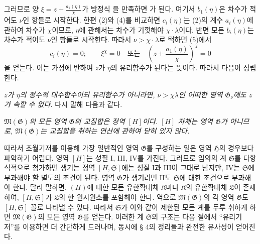 그러므로 양 $\xi=z+\frac{a_1(\eta)}{\chi}$가 방정식
을 만족하면
가 된다. 여기서 $b_1(\eta)$은 차수가 적어도 $\nu$인 항들로 시작한다. 한편 (2)와 (4)를 비교하면 $c_i(\eta)$는 (2)의 계수 $a_i(\eta)$에 관하여 차수가 $\chi$이므로, $\eta$에 관해서는 차수가 기껏해야 $\chi\cdot\lambda$이다. 반면 모든 $b_i(\eta)$는 차수가 적어도 $\nu$인 항들로 시작한다. 따라서 $\nu>\chi\cdot\lambda$로 택하면 (5)에서
\[
 c_i(\eta)=0;\qquad
 \xi^\chi=0\quad\text{또는}\quad
 \left(z+\frac{a_1(\eta)}{\chi}\right)^\chi=0
\]
을 얻는다. 이는 가정에 반하여 $z$가 $\eta$의 유리함수가 된다는 뜻이다. 따라서 다음이 성립한다.

\emph{$z$가 $\eta$의 정수적 대수함수이되 유리함수가 아니라면, $\nu>\chi\lambda$인 어떠한 영역 $\mathfrak G_\nu$에도 $z$가 속할 수 없다.} 다시 말해 다음과 같다.

\emph{$\mathfrak M(\mathfrak G)$의 모든 영역 $\mathfrak G$의 교집합은 정역 $[H]$이다. $[H]$ 자체는 영역 $\mathfrak G$가 아니므로, $\mathfrak M(\mathfrak G)$는 교집합을 취하는 연산에 관하여 닫혀 있지 않다.}

따라서 초월기저를 이용해 가장 일반적인 영역 $\mathfrak G$를 구성하는 일은 영역 $\mathfrak H$의 경우보다 파악하기 어렵다. 영역 $[H]$는 성질 I, III, IV를 가진다. 그러므로 임의의 계 $\mathfrak S$를 다항식적으로 첨가하면 생기는 정역 $[H,\mathfrak S]$에는 성질 I과 III이 그대로 남지만, IV는 $\mathfrak S$에 부과해야 할 별도의 조건이 된다. 영역 $\mathfrak G$가 생기려면 II도 $\mathfrak S$에 대한 조건으로 부과해야 한다. 달리 말하면, $(H)$에 대한 모든 유한확대체 $\mathfrak K$마다 $\mathfrak K$의 유한확대체 $\mathfrak L$이 존재하여, $[H,\mathfrak S]$가 $\mathfrak L$의 한 원시원소를 포함해야 한다. 역으로 $\mathfrak M(\mathfrak G)$의 각 영역 $\mathfrak G$도 $[H,\mathfrak S]$ 꼴로 나타낼 수 있다. 따라서 $\mathfrak S$가 이와 같이 제한된 모든 계를 두루 취하게 하면 $\mathfrak M(\mathfrak G)$의 모든 영역 $\mathfrak G$를 얻는다. 이러한 계 $\mathfrak S$의 구조는 다음 절에서 ``유리기저''를 이용하면 더 간단하게 드러나며, 동시에 § 4의 정리들과 완전한 유사성이 얻어진다.

